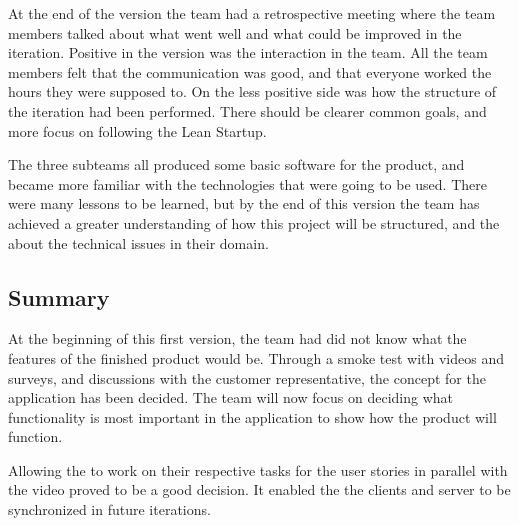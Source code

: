 At the end of the version the team had a retrospective meeting where the team members talked about what went well and what could be improved in the iteration. Positive in the version was the interaction in the team. All the team members felt that the communication was good, and that everyone worked the hours they were supposed to. On the less positive side was how the structure of the iteration had been performed. There should be clearer common goals, and more focus on following the Lean Startup.

The three subteams all produced some basic software for the product, and became more familiar with the technologies that were going to be used. There were many lessons to be learned, but by the end of this version the team has achieved a greater understanding of how this project will be structured, and the about the technical issues in their domain.  


\subsection{Summary}
At the beginning of this first version, the team had did not know what the features of the finished product would be. Through a smoke test with videos and surveys, and discussions with the customer representative, the concept for the application has been decided. The team will now focus on deciding what functionality is most important in the application to show how the product will function.

Allowing the to work on their respective tasks for the user stories in parallel with the video proved to be a good decision. It enabled the the clients and server to be synchronized in future iterations.

